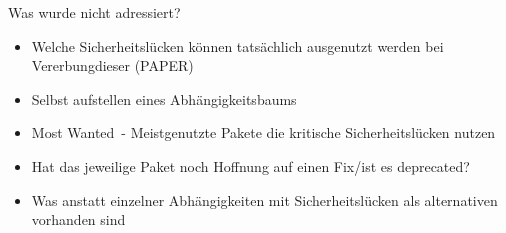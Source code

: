     Was wurde nicht adressiert?
    \begin{itemize}
        \item Welche Sicherheitslücken können tatsächlich ausgenutzt werden bei \glqq Vererbung\grqq dieser (PAPER)
        \item Selbst aufstellen eines Abhängigkeitsbaums
        \item \glqq Most Wanted\grqq~- Meistgenutzte Pakete die kritische Sicherheitslücken nutzen
        \item Hat das jeweilige Paket noch Hoffnung auf einen Fix/ist es deprecated?
        \item Was anstatt einzelner Abhängigkeiten mit Sicherheitslücken als alternativen vorhanden sind 
    \end{itemize}
